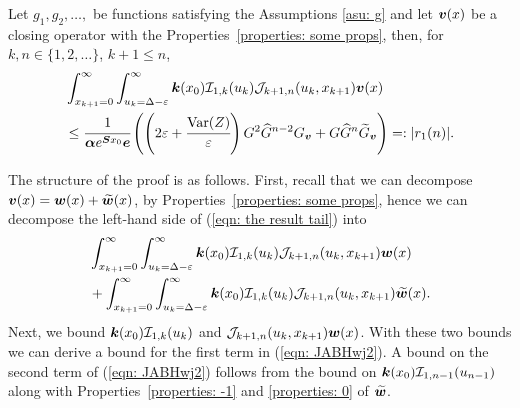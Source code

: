 \begin{cor}\label{cor: lh and rh}
	Let \(g_1, g_2, \dots,\) be functions satisfying the Assumptions \ref{asu: g} and let \(\boldsymbol v(x)\) be a closing operator with the Properties~\ref{properties: some props}, then, for \(k,n \in \{1,2,\dots\}\), \(k+1\leq n\),
	\begin{align}
		&\int_{x_{k+1}=0}^\infty \int_{u_k=\Delta-\varepsilon}^\infty \boldsymbol k(x_0)\mathcal I_{1,k}(u_k) \mathcal J_{k+1,n}(u_k,x_{k+1})\boldsymbol v(x) \nonumber
            	\\&\leq \cfrac{1}{\boldsymbol \alpha e^{\boldsymbol{S}x_0}\boldsymbol e}\left(\left(2\varepsilon + \cfrac{\mathrm{Var}(Z)}{\varepsilon}\right) G^2 \widehat G^{n-2} G_{\boldsymbol v} + G\widehat G^{n}\widetilde G_{\boldsymbol v}\right)  =: |r_1(n)|. \label{eqn: the result tail}
	\end{align}
\end{cor}
The structure of the proof is as follows. First, recall that we can decompose \(\boldsymbol v(x)=\boldsymbol w(x)+\widetilde{\boldsymbol{w}}(x)\), by Properties~\ref{properties: some props}, hence we can decompose the left-hand side of (\ref{eqn: the result tail}) into 
\begin{align}
	&\int_{x_{k+1}=0}^\infty \int_{u_k=\Delta-\varepsilon}^\infty \boldsymbol k(x_0)\mathcal I_{1,k}(u_k) \mathcal J_{k+1,n}(u_k,x_{k+1})\boldsymbol w(x) \nonumber 
	\\&{}+ \int_{x_{k+1}=0}^\infty \int_{u_k=\Delta-\varepsilon}^\infty \boldsymbol k(x_0)\mathcal I_{1,k}(u_k) \mathcal J_{k+1,n}(u_k,x_{k+1})\widetilde{\boldsymbol w}(x). \label{eqn: JABHwj2}
\end{align} 
Next, we bound \(\boldsymbol k(x_0)\mathcal I_{1,k}(u_k) \) and \(\mathcal J_{k+1,n}(u_k,x_{k+1})  {\boldsymbol w}(x)\). With these two bounds we can derive a bound for the first term in (\ref{eqn: JABHwj2}). A bound on the second term of (\ref{eqn: JABHwj2}) follows from the bound on \(\boldsymbol k(x_0)\mathcal I_{1,n-1}(u_{n-1})\) along with Properties~\ref{properties: -1} and \ref{properties: 0} of \(\widetilde{\boldsymbol w}\).

